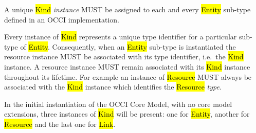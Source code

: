 \documentclass[10pt,a4paper]{article}
\begin{document}
A unique \hl{Kind} {\em instance} MUST be assigned to each and every
\hl{Entity} sub-type defined in an OCCI implementation.

Every instance of \hl{Kind} represents a unique type identifier for a
particular sub-type of \hl{Entity}.  Consequently, when an \hl{Entity}
sub-type is instantiated the resource instance MUST be associated with
its type identifier, i.e.~the \hl{Kind} instance.  A resource instance
MUST remain associated with its \hl{Kind} instance throughout its
lifetime.
%
For example an instance of \hl{Resource} MUST always be associated
with the \hl{Kind} instance which identifies the \hl{Resource} {\em type}.

In the initial instantiation of the OCCI Core Model, with no core
model extensions, three instances of \hl{Kind} will be present: one
for \hl{Entity}, another for \hl{Resource} and the last one for
\hl{Link}.

\end{document}
